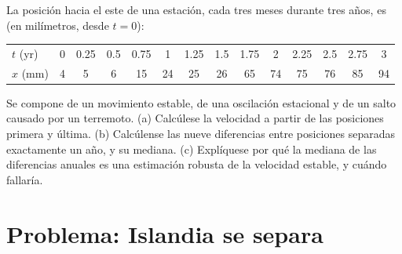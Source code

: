 \begin{exercise}[$\star\star\star$]\label{exo:b1:plate-kinematics:12}
La posición hacia el este de una estación, cada tres meses durante tres años, es
(en milímetros, desde $t = 0$):
\begin{center}\small
\begin{tabular}{l*{13}{c}}
\hline
$t$ (yr) & 0 & 0.25 & 0.5 & 0.75 & 1 & 1.25 & 1.5 & 1.75 & 2 & 2.25 & 2.5 & 2.75 & 3\\
$x$ (mm) & 4 & 5 & 6 & 15 & 24 & 25 & 26 & 65 & 74 & 75 & 76 & 85 & 94\\
\hline
\end{tabular}
\end{center}
Se compone de un movimiento estable, de una oscilación estacional y de un salto causado por un terremoto. (a) Calcúlese la velocidad a
partir de las posiciones primera y última. (b) Calcúlense las nueve diferencias entre posiciones separadas exactamente un año, y su
mediana. (c) Explíquese por qué la mediana de las diferencias anuales es una estimación robusta de la velocidad estable, y cuándo fallaría.
\end{exercise}

\section{Problema: Islandia se separa}

